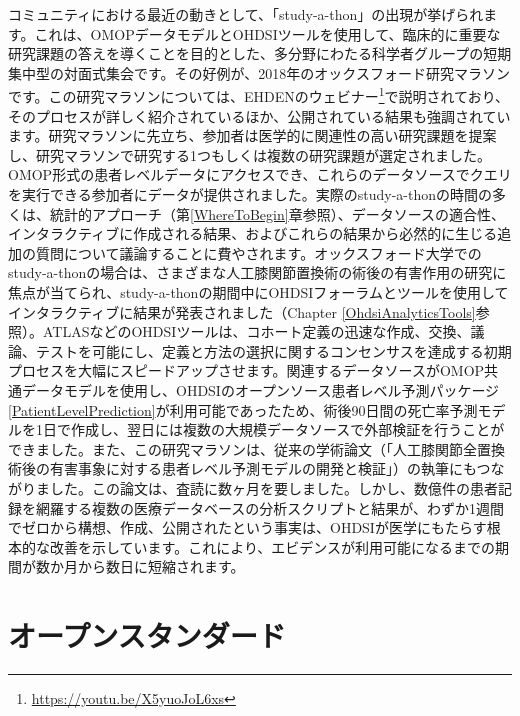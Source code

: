 \documentclass[
  11pt]{book}
\theoremstyle{definition}
\theoremstyle{definition}
\theoremstyle{definition}
\theoremstyle{definition}
\theoremstyle{remark}
\begin{document}
コミュニティにおける最近の動きとして、「study-a-thon」の出現が挙げられます。これは、OMOPデータモデルとOHDSIツールを使用して、臨床的に重要な研究課題の答えを導くことを目的とした、多分野にわたる科学者グループの短期集中型の対面式集会です。その好例が、2018年のオックスフォード研究マラソンです。この研究マラソンについては、EHDENのウェビナー\footnote{\url{https://youtu.be/X5yuoJoL6xs}}で説明されており、そのプロセスが詳しく紹介されているほか、公開されている結果も強調されています。研究マラソンに先立ち、参加者は医学的に関連性の高い研究課題を提案し、研究マラソンで研究する1つもしくは複数の研究課題が選定されました。OMOP形式の患者レベルデータにアクセスでき、これらのデータソースでクエリを実行できる参加者にデータが提供されました。実際のstudy-a-thonの時間の多くは、統計的アプローチ（第\ref{WhereToBegin}章参照）、データソースの適合性、インタラクティブに作成される結果、およびこれらの結果から必然的に生じる追加の質問について議論することに費やされます。オックスフォード大学でのstudy-a-thonの場合は、さまざまな人工膝関節置換術の術後の有害作用の研究に焦点が当てられ、study-a-thonの期間中にOHDSIフォーラムとツールを使用してインタラクティブに結果が発表されました（Chapter \ref{OhdsiAnalyticsTools}参照）。ATLASなどのOHDSIツールは、コホート定義の迅速な作成、交換、議論、テストを可能にし、定義と方法の選択に関するコンセンサスを達成する初期プロセスを大幅にスピードアップさせます。関連するデータソースがOMOP共通データモデルを使用し、OHDSIのオープンソース患者レベル予測パッケージ\ref{PatientLevelPrediction}が利用可能であったため、術後90日間の死亡率予測モデルを1日で作成し、翌日には複数の大規模データソースで外部検証を行うことができました。また、この研究マラソンは、従来の学術論文（「人工膝関節全置換術後の有害事象に対する患者レベル予測モデルの開発と検証」）の執筆にもつながりました。この論文は、査読に数ヶ月を要しました。しかし、数億件の患者記録を網羅する複数の医療データベースの分析スクリプトと結果が、わずか1週間でゼロから構想、作成、公開されたという事実は、OHDSIが医学にもたらす根本的な改善を示しています。これにより、エビデンスが利用可能になるまでの期間が数か月から数日に短縮されます。

\section{オープンスタンダード}\label{ux30aaux30fcux30d7ux30f3ux30b9ux30bfux30f3ux30c0ux30fcux30c9}

\end{document}
